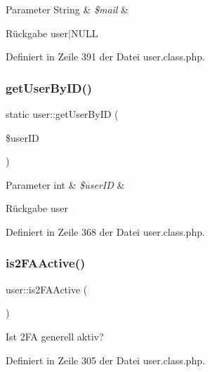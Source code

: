 \begin{DoxyParams}[1]{Parameter}
String & {\em \$mail} & \\
\hline
\end{DoxyParams}
\begin{DoxyReturn}{Rückgabe}
user$\vert$\+N\+U\+LL 
\end{DoxyReturn}


Definiert in Zeile 391 der Datei user.\+class.\+php.

\mbox{\label{classuser_a1c01d638516435924be8d4fc6de3417f}} 
\subsubsection{\texorpdfstring{get\+User\+By\+I\+D()}{getUserByID()}}
{\footnotesize\ttfamily static user\+::get\+User\+By\+ID (\begin{DoxyParamCaption}\item[{}]{\$user\+ID }\end{DoxyParamCaption})\hspace{0.3cm}{\ttfamily [static]}}


\begin{DoxyParams}[1]{Parameter}
int & {\em \$user\+ID} & \\
\hline
\end{DoxyParams}
\begin{DoxyReturn}{Rückgabe}
user 
\end{DoxyReturn}


Definiert in Zeile 368 der Datei user.\+class.\+php.

\mbox{\label{classuser_abf151c3ec6caaf5c0ca2127a6cef7ae7}} 
\subsubsection{\texorpdfstring{is2\+F\+A\+Active()}{is2FAActive()}}
{\footnotesize\ttfamily user\+::is2\+F\+A\+Active (\begin{DoxyParamCaption}{ }\end{DoxyParamCaption})}

Ist 2\+FA generell aktiv? 

Definiert in Zeile 305 der Datei user.\+class.\+php.

